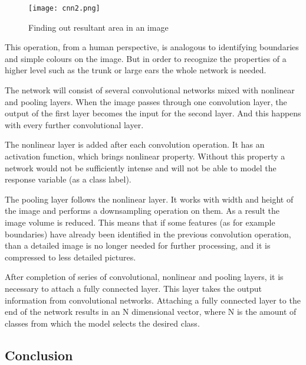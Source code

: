 \documentclass[12pt,a4paper]{article}
\begin{document}
\begin{figure}[h]
	\centering
	\texttt{[image: cnn2.png]}
	\caption{Finding out resultant area in an image}
\end{figure}

\par 
This operation, from a human perspective, is analogous to identifying boundaries and simple colours on the image. But in order to recognize the properties of a higher level such as the trunk or large ears the whole network is needed.

The network will consist of several convolutional networks mixed with nonlinear and pooling layers. When the image passes through one convolution layer, the output of the first layer becomes the input for the second layer. And this happens with every further convolutional layer.

The nonlinear layer is added after each convolution operation. It has an activation function, which brings nonlinear property. Without this property a network would not be sufficiently intense and will not be able to model the response variable (as a class label).

The pooling layer follows the nonlinear layer. It works with width and height of the image and performs a downsampling operation on them. As a result the image volume is reduced. This means that if some features (as for example boundaries) have already been identified in the previous convolution operation, than a detailed image is no longer needed for further processing, and it is compressed to less detailed pictures.

\newpage

After completion of series of convolutional, nonlinear and pooling layers, it is necessary to attach a fully connected layer. This layer takes the output information from convolutional networks. Attaching a fully connected layer to the end of the network results in an N dimensional vector, where N is the amount of classes from which the model selects the desired class.

\newpage
\begin{center}
\section{Conclusion}
\end{center}
\end{document}
